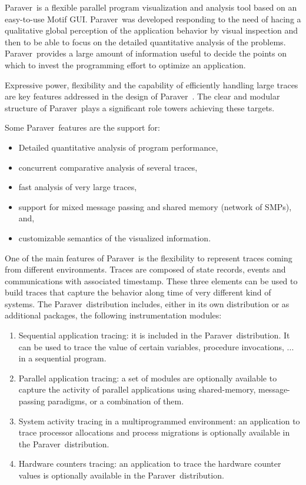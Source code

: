 \documentclass[twoside,a4,english,11pt]{book}
\newcommand{\PARAVER}{{\sf Paraver}\ }
\begin{document}
\PARAVER is a flexible parallel program visualization and analysis tool based on an easy-to-use Motif GUI. \PARAVER was developed responding to the need of hacing a qualitative global perception of the application behavior by visual inspection and then to be able to focus on the detailed quantitative analysis of the problems. \PARAVER provides a large amount of information useful to decide the points on which to invest the programming effort to optimize an application.

Expressive power, flexibility and the capability of efficiently handling large traces are key features addressed in the design of \PARAVER. The clear and modular structure of \PARAVER plays a significant role towers achieving these targets.

Some \PARAVER features are the support for:
\begin{itemize}
\item Detailed quantitative analysis of program performance,
\item concurrent comparative analysis of several traces,
\item fast analysis of very large traces,
\item support for mixed message passing and shared memory (network of SMPs), and,
\item customizable semantics of the visualized information.
\end{itemize}

One of the main features of \PARAVER is the flexibility to represent traces coming from different environments. Traces are composed of state records, events and communications with associated timestamp. These three elements can be used to build traces that capture the behavior along time of very different kind of systems. The \PARAVER distribution includes, either in its own distribution or as additional packages, the following instrumentation modules:
\begin{enumerate}
\item  Sequential application tracing: it is included in the \PARAVER distribution. It can be used to trace the value of certain variables, procedure invocations, ... in a sequential program.
\item Parallel application tracing: a set of modules are optionally available to capture the activity of parallel applications using shared-memory, message-passing paradigms, or a combination of them.
\item System activity tracing in a multiprogrammed environment: an application to trace processor allocations and process migrations is optionally available in the \PARAVER distribution.
\item Hardware counters tracing: an application to trace the hardware counter values is optionally available in the \PARAVER distribution.
\end{enumerate}
\end{document}
